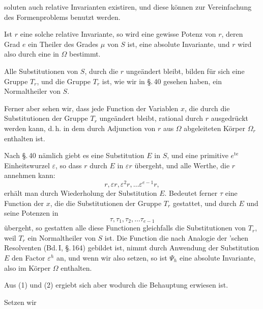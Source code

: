 soluten auch relative Invarianten existiren, und diese können zur
Vereinfachung des Formenproblems benutzt werden.

Ist $r$ eine solche relative Invariante, so wird eine gewisse
Potenz von $r$, deren Grad $e$ ein Theiler des Grades $\mu$ von $S$
ist, eine absolute Invariante, und $r$ wird also durch eine  in $\Omega$ bestimmt.

Alle Substitutionen von $S$, durch die $r$ ungeändert bleibt,
bilden für sich eine Gruppe $T_r$, und die Gruppe $T_r$ ist, wie wir
in \S.\,40 gesehen haben, ein Normaltheiler von $S$.

Ferner aber sehen wir, dass jede Function der Variablen $x$,
die durch die Substitutionen der Gruppe $T_r$ ungeändert bleibt,
rational durch $r$ ausgedrückt werden kann, d.\,h. in dem durch
Adjunction von $r$ aus $\Omega$ abgeleiteten Körper $\Omega_r$ enthalten ist.

Nach \S.\,40 nämlich giebt es eine Substitution $E$ in $S$, und
eine primitive $e^{\text{te}}$ Einheitswurzel $\varepsilon$, so dass $r$ durch $E$ in $\varepsilon r$
übergeht, und alle Werthe, die $r$ annehmen kann:
\[
r, \varepsilon r, \varepsilon^2 r, \ldots \varepsilon^{e-1} r,
\]
erhält man durch Wiederholung der Substitution $E$. Bedeutet
ferner $\tau$ eine Function der $x$, die die Substitutionen der Gruppe
$T_r$ gestattet, und durch $E$ und seine Potenzen in
\[
\tau, \tau_1, \tau_2, \ldots \tau_{e-1}
\]
übergeht, so gestatten alle diese Functionen gleichfalls die
Substitutionen von $T_r$, weil $T_r$ ein Normaltheiler von $S$ ist. Die
Function
die nach Analogie der 'schen Resolventen (Bd.\,I,
\S.\,164) gebildet ist, nimmt durch Anwendung der Substitution $E$
den Factor $\varepsilon^h$ an, und wenn wir also
setzen, so ist $\Psi_h$ eine absolute Invariante, also im Körper $\Omega$
enthalten.

Aus (1) und (2) ergiebt sich aber
wodurch die Behauptung erwiesen ist.

Setzen wir
